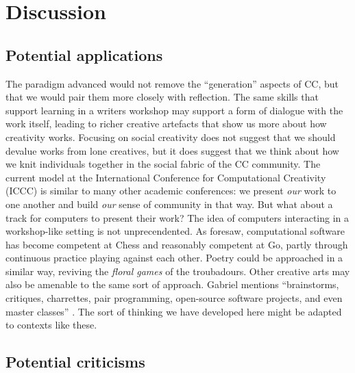 \section{Discussion} \label{sec:discussion}

\subsection{Potential applications}

The paradigm advanced would not remove the ``generation''
aspects of CC, but that we would pair them more closely with
reflection. The same skills that
support learning in a writers workshop may support a form of dialogue
with the work itself, leading to richer creative artefacts that show
us more about how creativity works.
%
%
Focusing on social creativity does not suggest that we should
devalue works from lone creatives, but it does suggest that we think
about how we knit individuals together in the social fabric of the CC
community.  The current model at the International Conference for
Computational Creativity (ICCC) is similar to many other academic
conferences: 
we present \emph{our} work to
one another and build \emph{our} sense of community in that way. But
what about a track for computers to present their work?
%
The idea of computers interacting in a workshop-like setting is not unprecendented.
As \cite{turing-intelligent} foresaw, computational software has become competent
at Chess and reasonably competent at Go, partly through continuous practice playing against each other.
Poetry could be approached in a similar way, reviving the \emph{floral games} of the troubadours.
Other creative arts may also be amenable to the same sort of approach.  Gabriel mentions
``brainstorms, critiques, charrettes, pair programming, open-source software projects, and
even master classes'' \cite[p. 11]{gabriel2002writer}.  The sort of thinking we
have developed here might be adapted to contexts like these.

\subsection{Potential criticisms}

